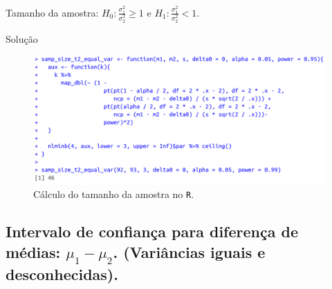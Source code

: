 \documentclass[9pt]{beamer}
\begin{document}
\begin{frame}{Tamanho da amostra: $H_0:\frac{\sigma_1^2}{\sigma_2^2} \geq 1$ e $H_1:\frac{\sigma_1^2}{\sigma_2^2} < 1$.}

\normalsize

\begin{block}{Solução}
	\begin{figure}[htbp]
		\centering
		\includegraphics[width=\linewidth]{figures/samp-size-2pop-bilateral-s2-unknown.png}
		\caption{Cálculo do tamanho da amostra no \texttt{R}.}
	\end{figure}
	
\end{block}
\end{frame}


\subsection{Intervalo de confiança para diferença de médias: $\mu_1 - \mu_2$. (Variâncias iguais e desconhecidas).}
\end{document}
